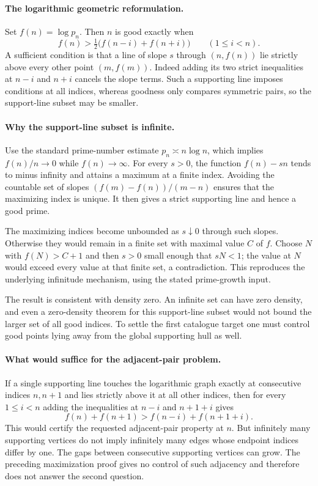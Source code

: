 \documentclass[11pt,a4paper]{article}
\begin{document}
\paragraph{The logarithmic geometric reformulation.}
Set $f(n)=\log p_n$. Then $n$ is good exactly when
\[
 f(n)>\tfrac12\bigl(f(n-i)+f(n+i)\bigr)\qquad(1\le i<n).
\]
A sufficient condition is that a line of slope $s$ through
$(n,f(n))$ lie strictly above every other point $(m,f(m))$.
Indeed adding its two strict inequalities at $n-i$ and $n+i$
cancels the slope terms. Such a supporting line imposes conditions at
all indices, whereas goodness only compares symmetric pairs, so the
support-line subset may be smaller.

\paragraph{Why the support-line subset is infinite.}
Use the standard prime-number estimate $p_n\asymp n\log n$, which
implies $f(n)/n\to0$ while $f(n)\to\infty$. For every $s>0$,
the function $f(n)-sn$ tends to minus infinity and attains a maximum
at a finite index. Avoiding the countable set of slopes
$(f(m)-f(n))/(m-n)$ ensures that the maximizing index is unique.
It then gives a strict supporting line and hence a good prime.

The maximizing indices become unbounded as $s\downarrow0$ through
such slopes. Otherwise they would remain in a finite set with maximal
value $C$ of $f$. Choose $N$ with $f(N)>C+1$ and then $s>0$
small enough that $sN<1$; the value at $N$ would exceed every value
at that finite set, a contradiction. This reproduces the underlying
infinitude mechanism, using the stated prime-growth input.

The result is consistent with density zero. An infinite set can have
zero density, and even a zero-density theorem for this support-line
subset would not bound the larger set of all good indices. To settle
the first catalogue target one must control good points lying away
from the global supporting hull as well.

\paragraph{What would suffice for the adjacent-pair problem.}
If a single supporting line touches the logarithmic graph exactly at
consecutive indices $n,n+1$ and lies strictly above it at all other
indices, then for every $1\le i<n$ adding the inequalities at
$n-i$ and $n+1+i$ gives
\[
                  f(n)+f(n+1)>f(n-i)+f(n+1+i).
\]
This would certify the requested adjacent-pair property at $n$.
But infinitely many supporting vertices do not imply infinitely many
edges whose endpoint indices differ by one. The gaps between consecutive
supporting vertices can grow. The preceding maximization proof gives
no control of such adjacency and therefore does not answer the second
question.
\end{document}
